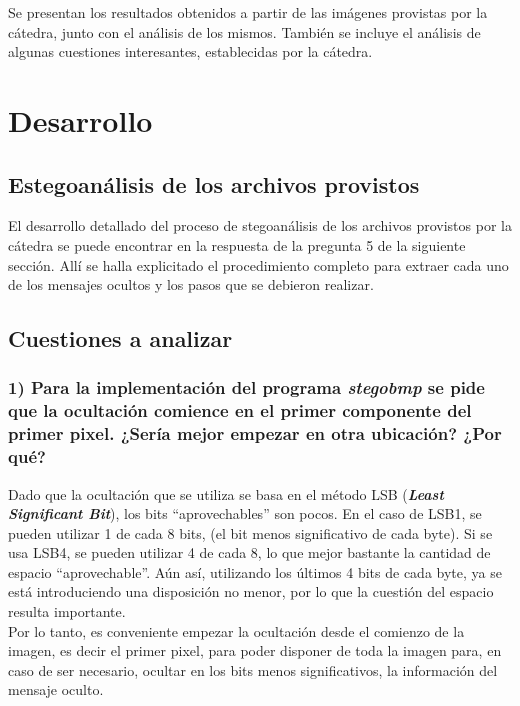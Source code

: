 \documentclass[a4paper,10pt]{article}
\begin{document}
Se presentan los resultados obtenidos a partir de las imágenes provistas por la cátedra, junto con el análisis de los mismos.
También se incluye el análisis de algunas cuestiones interesantes, establecidas por la cátedra.

\section{Desarrollo}

\subsection{Estegoanálisis de los archivos provistos}

El desarrollo detallado del proceso de stegoanálisis de los archivos provistos por la cátedra se puede encontrar en la respuesta de la pregunta 5 de la siguiente sección.
Allí se halla explicitado el procedimiento completo para extraer cada uno de los mensajes ocultos y los pasos que se debieron realizar.\\

\subsection{Cuestiones a analizar}

\subsubsection*{ 1) Para la implementación del programa \textit{stegobmp} se pide que la ocultación comience en el
primer componente del primer pixel. ¿Sería mejor empezar en otra ubicación? ¿Por qué?}

Dado que la ocultación que se utiliza se basa en el método LSB (\textit{\textbf{Least Significant Bit}}), los bits ``aprovechables'' son pocos. En el caso de 
LSB1, se pueden utilizar 1 de cada 8 bits, (el bit menos significativo de cada byte). Si se usa LSB4, se pueden utilizar 4 de cada 8, lo que mejor bastante la cantidad de 
espacio ``aprovechable''. Aún así, utilizando los últimos 4 bits de cada byte, ya se está introduciendo una disposición no menor, por lo que la cuestión del espacio resulta 
importante. \\

Por lo tanto, es conveniente empezar la ocultación desde el comienzo de la imagen, es decir el primer pixel, para poder disponer de toda la imagen para, en caso de ser necesario,
ocultar en los bits menos significativos, la información del mensaje oculto.\\
\end{document}
